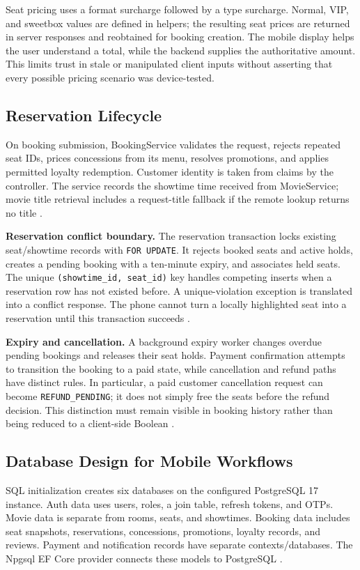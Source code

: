 \documentclass[conference]{IEEEtran}
\newcommand{\code}[1]{\texttt{#1}}
\begin{document}
Seat pricing uses a format surcharge followed by a type surcharge. Normal,
VIP, and sweetbox values are defined in helpers; the resulting seat prices
are returned in server responses and reobtained for booking creation. The
mobile display helps the user understand a total, while the backend supplies
the authoritative amount. This limits trust in stale or manipulated client
inputs without asserting that every possible pricing scenario was device-tested.

\subsection{Reservation Lifecycle}
On booking submission, BookingService validates the request, rejects repeated
seat IDs, prices concessions from its menu, resolves promotions, and applies
permitted loyalty redemption. Customer identity is taken from claims by the
controller. The service records the showtime time received from MovieService;
movie title retrieval includes a request-title fallback if the remote lookup
returns no title \cite{booking}.

\textbf{Reservation conflict boundary.} The reservation transaction locks existing seat/showtime records with
\code{FOR UPDATE}. It rejects booked seats and active holds, creates a pending
booking with a ten-minute expiry, and associates held seats. The unique
\code{(showtime\_id, seat\_id)} key handles competing inserts when a reservation
row has not existed before. A unique-violation exception is translated into a
conflict response. The phone cannot turn a locally highlighted seat into a
reservation until this transaction succeeds \cite{booking,db,postgres}.

\textbf{Expiry and cancellation.} A background expiry worker changes overdue pending bookings and releases their
seat holds. Payment confirmation attempts to transition the booking to a paid
state, while cancellation and refund paths have distinct rules. In particular,
a paid customer cancellation request can become \code{REFUND\_PENDING}; it
does not simply free the seats before the refund decision. This distinction
must remain visible in booking history rather than being reduced to a
client-side Boolean \cite{booking}.

\subsection{Database Design for Mobile Workflows}
SQL initialization creates six databases on the configured PostgreSQL 17
instance. Auth data uses users, roles, a join table, refresh tokens, and OTPs.
Movie data is separate from rooms, seats, and showtimes. Booking data includes
seat snapshots, reservations, concessions, promotions, loyalty records, and
reviews. Payment and notification records have separate contexts/databases.
The Npgsql EF Core provider connects these models to PostgreSQL
\cite{db,booking,npgsql}.
\end{document}
